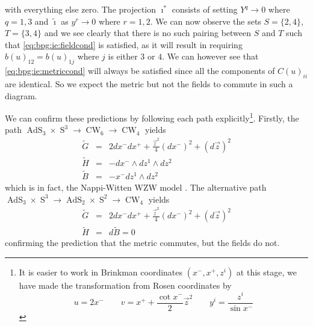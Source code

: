 \documentclass[11pt, a4paper, titlepage]{article}
\DeclareMathOperator{\AdS}{AdS}
\DeclareMathOperator{\Sphere}{S}
\DeclareMathOperator{\CW}{CW}
\let\S\Sphere
\begin{document}
with everything else zero. The projection $\imath^*$ consists of setting
$Y^q\rightarrow 0$ where $q=1,3$ and $\widetilde{\imath}$ as $y^r\rightarrow 0$
where $r=1,2$. We can now observe the sets $S=\{2,4\}$, $T=\{3,4\}$ and we see
clearly that there is no such pairing between $S$ and $T$ such that
\eqref{eq:bpg:ie:fieldcond} is satisfied, as it will result in requiring
$b(u)_{12}=b(u)_{1j}$ where $j$ is either $3$ or $4$. We can however see that
\eqref{eq:bpg:ie:metriccond} will always be satisfied since all the components
of $C(u)_{ii}$ are identical. So we expect the metric but not the fields to
commute in such a diagram.

We can confirm these predictions by following each path explicitly\footnote{It
  is easier to work in Brinkman \cite{brinkman} coordinates $(x^-,x^+,z^i)$ at
  this stage, we have made the transformation from Rosen coordinates by
  \begin{equation}
    \label{eq:ex:jose:brinkman}
    u=2x^- \qquad v=x^+ + \frac{\cot{x^-}}{2}\vec{z}^2 \qquad y^i=\frac{z^i}{\sin{x^-}}
  \end{equation}}. Firstly, the path
$\AdS_3\times\S^3\rightarrow\CW_6\rightarrow\CW_4$ yields
\begin{eqnarray}
  \label{eq:bpg:ex:jose:path1:G}
  \widetilde{G}&=&2dx^-dx^+ +\frac{\vec{z}^2}{4}\left(d
    x^-\right)^2 + \left(d\vec{z}\right)^2 \\
  \label{eq:bpg:ex:jose:path1:H}
  \widetilde{H}&=&-dx^-\wedge dz^1\wedge dz^2 \\
  \label{eq:bpg:ex:jose:path1:B}
  \widetilde{B}&=&-x^- dz^1\wedge dz^2
\end{eqnarray}
which is in fact, the Nappi-Witten WZW model \cite{nw}. The alternative path
$\AdS_3\times\S^3\rightarrow\AdS_2\times\S^2\rightarrow\CW_4$ yields
\begin{eqnarray}
  \label{eq:bpg:ex:jose:path2:G}
  \widetilde{G}&=&2dx^-dx^+ +\frac{\vec{z}^2}{4}\left(d
    x^-\right)^2 + \left(d\vec{z}\right)^2 \\
  \label{eq:bpg:ex:jose:path2:fields}
  \widetilde{H}&=&d\widetilde{B}=0
\end{eqnarray}
confirming the prediction that the metric commutes, but the fields do not.
\end{document}
